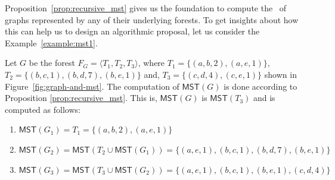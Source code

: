 Proposition~\ref{prop:recursive_mst} gives us the foundation to compute the \mst\ of graphs 
represented by any of their underlying forests. To get insights about how this can help us to design an algorithmic proposal,  
let us consider the Example~\ref{example:mst1}.

\begin{example} 
\label{example:mst1}
Let $G$ be the forest $F_G=\langle T_1, T_2, T_3\rangle$, where $T_1= \{(a,b,2),(a,e,1)\}$, $T_2= \{(b,c,1),(b,d,7),(b,e,1)\}$ and, $T_3 = \{(c,d,4) ,(c,e,1)\}$ shown in Figure~\ref{fig:graph-and-mst}. The computation of $\mathsf{MST}(G)$ is done according to Proposition \ref{prop:recursive_mst}. This is, $\mathsf{MST}(G)$ is $\mathsf{MST}(T_3)$ and is computed as follows:  
\begin{enumerate}
\item $\mathsf{MST}(G_1) = T_1 = \{(a,b,2),(a,e,1)\}$
\item $\mathsf{MST}(G_2) = \mathsf{MST}( T_2 \cup \mathsf{MST}(G_1) ) = \{(a,e,1), (b,c,1), (b,d,7), (b,e,1)\}$
\item $\mathsf{MST}(G_3) = \mathsf{MST}( T_3 \cup \mathsf{MST}(G_2) ) = \{(a,e,1), (b,c,1), (b,e,1), (c,d,4)\}$ 
\end{enumerate}
\end{example}

